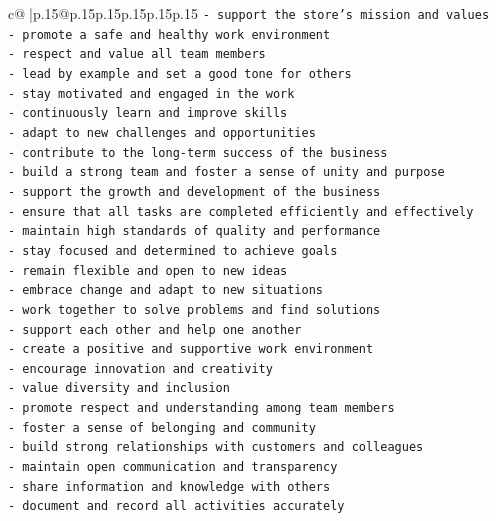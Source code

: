 \documentclass{article}
\begin{document}
{\begin{supertabular}{c@{$\;$}|p{.15\linewidth}@{}p{.15\linewidth}p{.15\linewidth}p{.15\linewidth}p{.15\linewidth}p{.15\linewidth}}
{{{\texttt{{-} support the store's mission and values} \\
\texttt{{-} promote a safe and healthy work environment} \\
\texttt{{-} respect and value all team members} \\
\texttt{{-} lead by example and set a good tone for others} \\
\texttt{{-} stay motivated and engaged in the work} \\
\texttt{{-} continuously learn and improve skills} \\
\texttt{{-} adapt to new challenges and opportunities} \\
\texttt{{-} contribute to the long{-}term success of the business} \\
\texttt{{-} build a strong team and foster a sense of unity and purpose} \\
\texttt{{-} support the growth and development of the business} \\
\texttt{{-} ensure that all tasks are completed efficiently and effectively} \\
\texttt{{-} maintain high standards of quality and performance} \\
\texttt{{-} stay focused and determined to achieve goals} \\
\texttt{{-} remain flexible and open to new ideas} \\
\texttt{{-} embrace change and adapt to new situations} \\
\texttt{{-} work together to solve problems and find solutions} \\
\texttt{{-} support each other and help one another} \\
\texttt{{-} create a positive and supportive work environment} \\
\texttt{{-} encourage innovation and creativity} \\
\texttt{{-} value diversity and inclusion} \\
\texttt{{-} promote respect and understanding among team members} \\
\texttt{{-} foster a sense of belonging and community} \\
\texttt{{-} build strong relationships with customers and colleagues} \\
\texttt{{-} maintain open communication and transparency} \\
\texttt{{-} share information and knowledge with others} \\
\texttt{{-} document and record all activities accurately} \\
}}}
\end{supertabular}}
\end{document}
